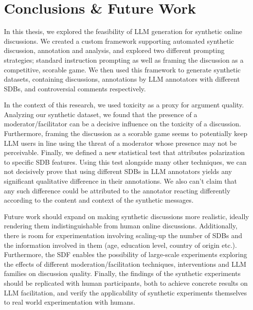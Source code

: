 %
\chapter{Conclusions \& Future Work}
\label{sec:conclusions}

In this thesis, we explored the feasibility of LLM generation for synthetic online discussions. We created a custom framework supporting automated synthetic discussion, annotation and analysis, and explored two different prompting strategies; standard instruction prompting as well as framing the discussion as a competitive, scorable game. We then used this framework to generate synthetic datasets, containing discussions, annotations by LLM annotators with different \acp{SDB}, and controversial comments respectively. 

In the context of this research, we used toxicity as a proxy for argument quality. Analyzing our synthetic dataset, we found that the presence of a moderator/facilitator can be a decisive influence on the toxicity of a discussion. Furthermore, framing the discussion as a scorable game seems to potentially keep LLM users in line using the threat of a moderator whose presence may not be perceivable. Finally, we defined a new statistical test that attributes polarization to specific \ac{SDB} features. Using this test alongside many other techniques, we can not decisively prove that using different \acp{SDB} in LLM annotators yields any significant qualitative difference in their annotations. We also can't claim that any such difference could be attributed to the annotator reacting differently according to the content and context of the synthetic messages.

Future work should expand on making synthetic discussions more realistic, ideally rendering them indistinguishable from human online discussions. Additionally, there is room for experimentation involving scaling-up the number of \acp{SDB} and the information involved in them (age, education level, country of origin etc.). Furthermore, the \ac{SDF} enables the possibility of large-scale experiments exploring the effects of different moderation/facilitation techniques, interventions and LLM families on discussion quality. Finally, the findings of the synthetic experiments should be replicated with human participants, both to achieve concrete results on LLM facilitation, and verify the applicability of synthetic experiments themselves to real world experimentation with humans.